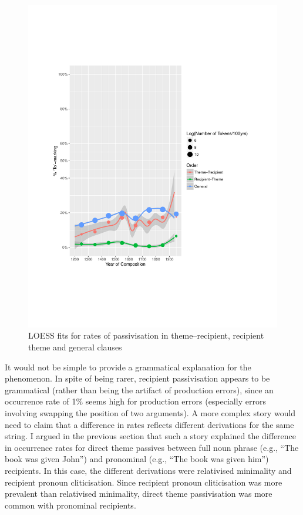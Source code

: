 	\begin{figure}[ht!]
		\includegraphics[width=\linewidth]{../images/brit-pas}
		\caption{LOESS fits for rates of passivisation in theme--recipient, recipient theme and general clauses}
		\label{fig:brit-pas}
	\end{figure}

	It would not be simple to provide a grammatical explanation for the phenomenon. In spite of being rarer, recipient passivisation appears to be grammatical (rather than being the artifact of production errors), since an occurrence rate of 1\% seems high for production errors (especially errors involving swapping the position of two arguments). A more complex story would need to claim that a difference in rates reflects different derivations for the same string. I argued in the previous section that such a story explained the difference in occurrence rates for direct theme passives between full noun phrase (e.g., ``The book was given John'') and pronominal (e.g., ``The book was given him'') recipients. In this case, the different derivations were relativised minimality and recipient pronoun cliticisation. Since recipient pronoun cliticisation was more prevalent than relativised minimality, direct theme passivisation was more common with pronominal recipients.
	
